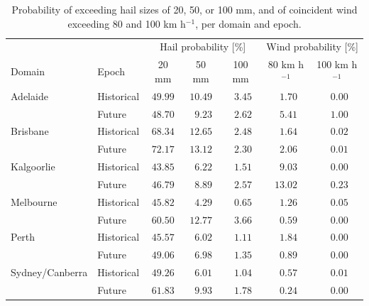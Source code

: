 \documentclass[draft,grl]{agutexSI2019}\usepackage[]{graphicx}\usepackage[]{xcolor}
\begin{document}
\begin{table}
    \centering
    \caption{Probability of exceeding hail sizes of 20, 50, or 100 mm, and of coincident wind exceeding 80 and 100 km h$^{-1}$, per domain and epoch.}
    \label{tab:exceedence_probs}
    \begin{tabular}{llccccc}
    \hline
    & & \multicolumn{3}{c}{Hail probability [\%]} & \multicolumn{2}{c}{Wind probability [\%]} \\ 
    Domain & Epoch & 20 mm & 50 mm & 100 mm & 80 km h$^{-1}$ & \multicolumn{1}{c}{100 km h$^{-1}$} \\ 
    \hline
Adelaide & Historical  & $49.99$ & $10.49$ & $\phantom{0}3.45$ & $\phantom{0}1.70$ & $\phantom{0}0.00$ \\ & Future  & $48.70$ & $\phantom{0}9.23$ & $\phantom{0}2.62$ & $\phantom{0}5.41$ & $\phantom{0}1.00$ \\Brisbane & Historical  & $68.34$ & $12.65$ & $\phantom{0}2.48$ & $\phantom{0}1.64$ & $\phantom{0}0.02$ \\ & Future  & $72.17$ & $13.12$ & $\phantom{0}2.30$ & $\phantom{0}2.06$ & $\phantom{0}0.01$ \\Kalgoorlie & Historical  & $43.85$ & $\phantom{0}6.22$ & $\phantom{0}1.51$ & $\phantom{0}9.03$ & $\phantom{0}0.00$ \\ & Future  & $46.79$ & $\phantom{0}8.89$ & $\phantom{0}2.57$ & $13.02$ & $\phantom{0}0.23$ \\Melbourne & Historical  & $45.82$ & $\phantom{0}4.29$ & $\phantom{0}0.65$ & $\phantom{0}1.26$ & $\phantom{0}0.05$ \\ & Future  & $60.50$ & $12.77$ & $\phantom{0}3.66$ & $\phantom{0}0.59$ & $\phantom{0}0.00$ \\Perth & Historical  & $45.57$ & $\phantom{0}6.02$ & $\phantom{0}1.11$ & $\phantom{0}1.84$ & $\phantom{0}0.00$ \\ & Future  & $49.06$ & $\phantom{0}6.98$ & $\phantom{0}1.35$ & $\phantom{0}0.89$ & $\phantom{0}0.00$ \\Sydney/Canberra & Historical  & $49.26$ & $\phantom{0}6.01$ & $\phantom{0}1.04$ & $\phantom{0}0.57$ & $\phantom{0}0.01$ \\ & Future  & $61.83$ & $\phantom{0}9.93$ & $\phantom{0}1.78$ & $\phantom{0}0.24$ & $\phantom{0}0.00$ \\
    \hline 
    \end{tabular}
\end{table}
\end{document}
